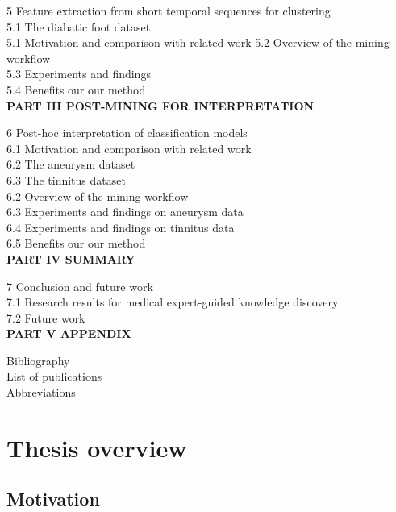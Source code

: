 \documentclass[
]{book}
\begin{document}
5 Feature extraction from short temporal sequences for clustering\\
5.1 The diabatic foot dataset\\
5.1 Motivation and comparison with related work 5.2 Overview of the mining workflow\\
5.3 Experiments and findings\\
5.4 Benefits our our method\\

\textbf{PART III POST-MINING FOR INTERPRETATION}

6 Post-hoc interpretation of classification models\\
6.1 Motivation and comparison with related work\\
6.2 The aneurysm dataset\\
6.3 The tinnitus dataset\\
6.2 Overview of the mining workflow\\
6.3 Experiments and findings on aneurysm data\\
6.4 Experiments and findings on tinnitus data\\
6.5 Benefits our our method\\

\textbf{PART IV SUMMARY}

7 Conclusion and future work\\
7.1 Research results for medical expert-guided knowledge discovery\\
7.2 Future work\\

\textbf{PART V APPENDIX}

Bibliography\\
List of publications\\
Abbreviations\\

\hypertarget{intro}{%
\chapter{Thesis overview}\label{intro}}

\hypertarget{motivation}{%
\section{Motivation}\label{motivation}}
\end{document}
